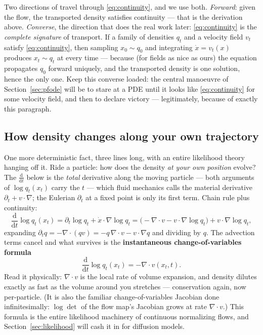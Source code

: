 \documentclass[10pt,a4paper]{article}
\newcommand{\dd}{\mathrm{d}}
\begin{document}
Two directions of travel through \eqref{eq:continuity}, and we use both.
\emph{Forward}: given the flow, the transported density satisfies
continuity --- that is the derivation above. \emph{Converse}, the
direction that does the real work later: \eqref{eq:continuity} is the
\emph{complete signature} of transport. If a family of densities $q_t$
and a velocity field $v_t$ satisfy \eqref{eq:continuity}, then sampling
$x_0 \sim q_0$ and integrating $\dot x = v_t(x)$ produces
$x_t \sim q_t$ at every time --- because (for fields as nice as ours)
the equation propagates $q_0$ forward uniquely, and the transported
density is one solution, hence the only one. Keep this converse loaded:
the central manoeuvre of Section~\ref{sec:pfode} will be to stare at a
PDE until it looks like \eqref{eq:continuity} for some velocity field,
and then to declare victory --- legitimately, because of exactly this
paragraph.

\subsection{How density changes along your own trajectory}
\label{sec:cov}

One more deterministic fact, three lines long, with an entire likelihood
theory hanging off it. Ride a particle: how does the density \emph{at
your own position} evolve? The $\tfrac{\dd}{\dd t}$ below is the
\emph{total} derivative along the moving particle --- both arguments of
$\log q_t(x_t)$ carry the $t$ --- which fluid mechanics calls the
material derivative $\partial_t + v \cdot \nabla$; the Eulerian
$\partial_t$ at a fixed point is only its first term. Chain rule plus
continuity:
\begin{equation}
\frac{\dd}{\dd t} \log q_t(x_t)
= \partial_t \log q_t + \dot x \cdot \nabla \log q_t
= \big( -\nabla\!\cdot\!v - v \cdot \nabla \log q_t \big)
+ v \cdot \nabla \log q_t ,
\end{equation}
expanding $\partial_t q = -\nabla\!\cdot\!(qv) = -q\,\nabla\!\cdot\!v
- v\!\cdot\!\nabla q$ and dividing by $q$. The advection terms cancel
and what survives is the \textbf{instantaneous change-of-variables
formula}
\begin{equation}
\boxed{\;\frac{\dd}{\dd t} \log q_t(x_t) = -\nabla\!\cdot\!v(x_t, t).\;}
\label{eq:cov}
\end{equation}
Read it physically: $\nabla\!\cdot\!v$ is the local rate of volume
expansion, and density dilutes exactly as fast as the volume around you
stretches --- conservation again, now per-particle. (It is also the
familiar change-of-variables Jacobian done infinitesimally:
$\log\det$ of the flow map's Jacobian grows at rate $\nabla\!\cdot\!v$.)
This formula is the entire likelihood machinery of continuous
normalizing flows, and Section~\ref{sec:likelihood} will cash it in for
diffusion models.
\end{document}
